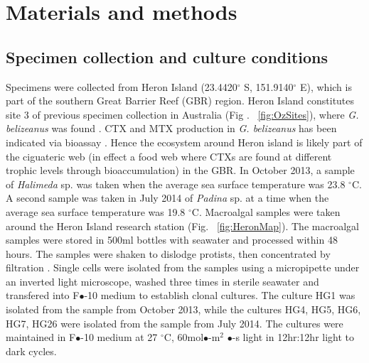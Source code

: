 \documentclass[12pt]{article}
\begin{document}
 \newpage
\section{Materials and methods}

\subsection{Specimen collection and culture conditions}
Specimens were collected from Heron Island (23.4420$^{\circ}$ S, 151.9140$^{\circ}$ E), which is part of the southern Great Barrier Reef (GBR) region. Heron Island constitutes site 3 of previous specimen collection in Australia (Fig . ~\ref{fig:OzSites}), where \emph{G. belizeanus} was found \citep{murray2014molecular}. CTX and MTX production in \emph{G. belizeanus} has been indicated via bioassay \citep{chinain2010growth,holland2013differences}. Hence the ecosystem around Heron island is likely part of the ciguateric web (in effect a food web where CTXs are found at different trophic levels through bioaccumulation) in the GBR.
In October 2013, a sample of \emph{Halimeda} sp. was taken when the average sea surface temperature was 23.8 $^{\circ}$C. 
A second sample was taken in July 2014 of \emph{Padina} sp. at a time when the average sea surface temperature was 19.8 $^{\circ}$C.
Macroalgal samples were taken around the Heron Island research station (Fig. ~\ref{fig:HeronMap}). The macroalgal samples were stored in 500ml bottles with seawater and processed within 48 hours. The samples were shaken to dislodge protists, then concentrated by filtration \citep{litaker2010global}. Single cells were isolated from the samples using a micropipette under an inverted light microscope, washed three times in sterile seawater and transfered into F$\bullet$-10 medium \citep{holmes1991strain} to establish clonal cultures.
The culture HG1 was isolated from the sample from October 2013, while the cultures HG4, HG5, HG6, HG7, HG26 were isolated from the sample from July 2014.
The cultures were maintained in F$\bullet$-10 medium at 27 $^{\circ}$C, 60mol$\bullet$-m$^{2}$ $\bullet$-s light in 12hr:12hr light to dark cycles.


\end{document}
